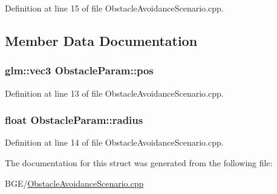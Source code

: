 Definition at line 15 of file Obstacle\-Avoidance\-Scenario.\-cpp.



\subsection{Member Data Documentation}
\hypertarget{struct_obstacle_param_ae54de802f60edf3bdf655ae0d9344693}{
\subsubsection[{pos}]{\setlength{\rightskip}{0pt plus 5cm}glm\-::vec3 Obstacle\-Param\-::pos}}\label{struct_obstacle_param_ae54de802f60edf3bdf655ae0d9344693}


Definition at line 13 of file Obstacle\-Avoidance\-Scenario.\-cpp.

\hypertarget{struct_obstacle_param_a180dca5ff2af386f19c530564ee94883}{
\subsubsection[{radius}]{\setlength{\rightskip}{0pt plus 5cm}float Obstacle\-Param\-::radius}}\label{struct_obstacle_param_a180dca5ff2af386f19c530564ee94883}


Definition at line 14 of file Obstacle\-Avoidance\-Scenario.\-cpp.



The documentation for this struct was generated from the following file\-:\begin{DoxyCompactItemize}
\item 
B\-G\-E/\hyperlink{_obstacle_avoidance_scenario_8cpp}{Obstacle\-Avoidance\-Scenario.\-cpp}\end{DoxyCompactItemize}
